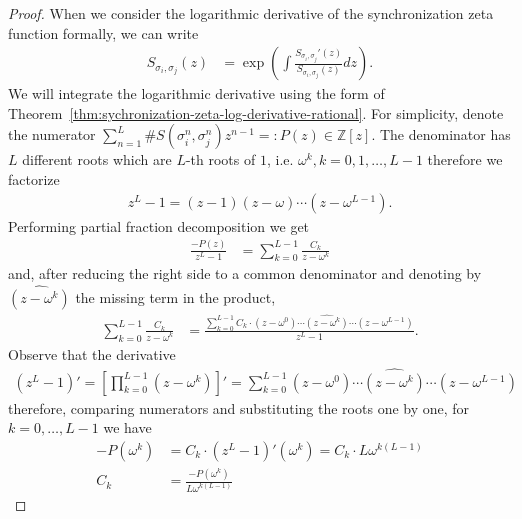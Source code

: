 \documentclass[oneside]{amsart}
\def\Z{\mathbb{Z}}
\begin{document}
\begin{proof}
  When we consider the logarithmic derivative of the synchronization zeta function formally, we can write
  \begin{align*}
    S_{\sigma_i, \sigma_j}(z) &= \exp \left( \int \frac{S_{\sigma_i, \sigma_j}'(z)}{S_{\sigma_i, \sigma_j}(z)} dz \right).
  \end{align*}
  We will integrate the logarithmic derivative using the form of Theorem~\ref{thm:sychronization-zeta-log-derivative-rational}.
  For simplicity, denote the numerator $\sum_{n=1}^{L} \#S(\sigma_i^n, \sigma_j^n) z^{n-1} =: P(z) \in \Z[z]$.
  The denominator has $L$ different roots which are $L$-th roots of $1$, i.e. $\omega^k, k=0,1,\ldots,L-1$
  therefore we factorize
  \begin{align*}
    z^L-1 = (z-1)(z-\omega)\cdots(z-\omega^{L-1}).
  \end{align*}
  Performing partial fraction decomposition we get
  \begin{align*}
    \frac{-P(z)}{z^L-1} &= \sum_{k=0}^{L-1} \frac{C_k}{z-\omega^k}
  \end{align*}
  and, after reducing the right side to a common denominator and denoting by $\widehat{(z-\omega^k)}$
  the missing term in the product,
  \begin{align*}
    \sum_{k=0}^{L-1} \frac{C_k}{z-\omega^k}
    &= \frac{\sum_{k=0}^{L-1} C_k \cdot (z-\omega^0) \cdots \widehat{(z-\omega^k)} \cdots (z-\omega^{L-1})}{z^L-1}.
  \end{align*}
  Observe that the derivative
  \begin{align*}
    (z^L-1)' = \left[ \prod_{k=0}^{L-1} (z-\omega^k) \right]'
      = \sum_{k=0}^{L-1} (z-\omega^0) \cdots \widehat{(z-\omega^k)} \cdots (z-\omega^{L-1})
  \end{align*}
  therefore, comparing numerators and substituting the roots one by one, for $k=0,\ldots,L-1$ we have
  \begin{align*}
    -P(\omega^k) &= C_k \cdot (z^L-1)'(\omega^k) = C_k \cdot L\omega^{k(L-1)} \\
    C_k &= \frac{-P(\omega^k)}{L\omega^{k(L-1)}}
  \end{align*}


\end{proof}
\end{document}
